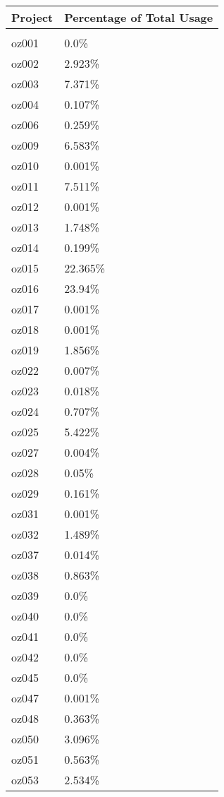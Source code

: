 \documentclass{article}%
\begin{document}
%
\begin{longtabu}{X[l] X[r]}%
\textbf{Project}&\textbf{Percentage of Total Usage}\\%
\hline%
&\\%
oz001&0.0\%\\%
\hline%
oz002&2.923\%\\%
\hline%
oz003&7.371\%\\%
\hline%
oz004&0.107\%\\%
\hline%
oz006&0.259\%\\%
\hline%
oz009&6.583\%\\%
\hline%
oz010&0.001\%\\%
\hline%
oz011&7.511\%\\%
\hline%
oz012&0.001\%\\%
\hline%
oz013&1.748\%\\%
\hline%
oz014&0.199\%\\%
\hline%
oz015&22.365\%\\%
\hline%
oz016&23.94\%\\%
\hline%
oz017&0.001\%\\%
\hline%
oz018&0.001\%\\%
\hline%
oz019&1.856\%\\%
\hline%
oz022&0.007\%\\%
\hline%
oz023&0.018\%\\%
\hline%
oz024&0.707\%\\%
\hline%
oz025&5.422\%\\%
\hline%
oz027&0.004\%\\%
\hline%
oz028&0.05\%\\%
\hline%
oz029&0.161\%\\%
\hline%
oz031&0.001\%\\%
\hline%
oz032&1.489\%\\%
\hline%
oz037&0.014\%\\%
\hline%
oz038&0.863\%\\%
\hline%
oz039&0.0\%\\%
\hline%
oz040&0.0\%\\%
\hline%
oz041&0.0\%\\%
\hline%
oz042&0.0\%\\%
\hline%
oz045&0.0\%\\%
\hline%
oz047&0.001\%\\%
\hline%
oz048&0.363\%\\%
\hline%
oz050&3.096\%\\%
\hline%
oz051&0.563\%\\%
\hline%
oz053&2.534\%\\%

\end{longtabu}
\end{document}
